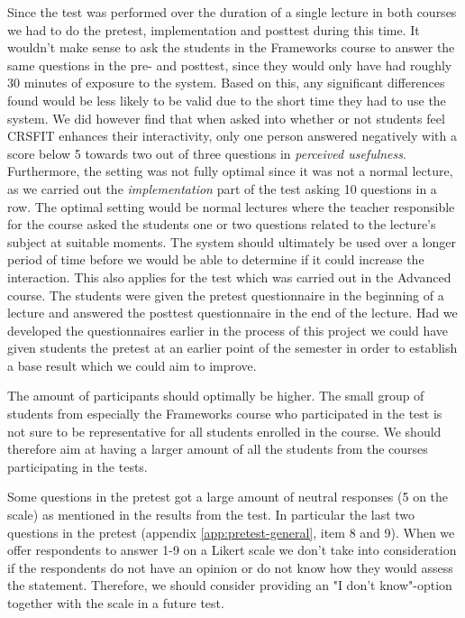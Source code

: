 Since the test was performed over the duration of a single lecture in both courses we had to do the pretest, implementation and posttest during this time. It wouldn't make sense to ask the students in the Frameworks course to answer the same questions in the pre- and posttest, since they would only have had roughly 30 minutes of exposure to the system. Based on this, any significant differences found would be less likely to be valid due to the short time they had to use the system. We did however find that when asked into whether or not students feel CRSFIT enhances their interactivity, only one person answered negatively with a score below 5 towards two out of three questions in \emph{perceived usefulness}. Furthermore, the setting was not fully optimal since it was not a normal lecture, as we carried out the \emph{implementation} part of the test asking 10 questions in a row. The optimal setting would be normal lectures where the teacher responsible for the course asked the students one or two questions related to the lecture's subject at suitable moments. The system should ultimately be used over a longer period of time before we would be able to determine if it could increase the interaction. This also applies for the test which was carried out in the Advanced course. The students were given the pretest questionnaire in the beginning of a lecture and answered the posttest questionnaire in the end of the lecture. Had we developed the questionnaires earlier in the process of this project we could have given students the pretest at an earlier point of the semester in order to establish a base result which we could aim to improve.

The amount of participants should optimally be higher. The small group of students from especially the Frameworks course who participated in the test is not sure to be representative for all students enrolled in the course. We should therefore aim at having a larger amount of all the students from the courses participating in the tests.

Some questions in the pretest got a large amount of neutral responses (5 on the scale) as mentioned in the results from the test. In particular the last two questions in the pretest (appendix \ref{app:pretest-general}, item 8 and 9). When we offer respondents to answer 1-9 on a Likert scale we don't take into consideration if the respondents do not have an opinion or do not know how they would assess the statement. Therefore, we should consider providing an "I don't know"-option together with the scale in a future test.


